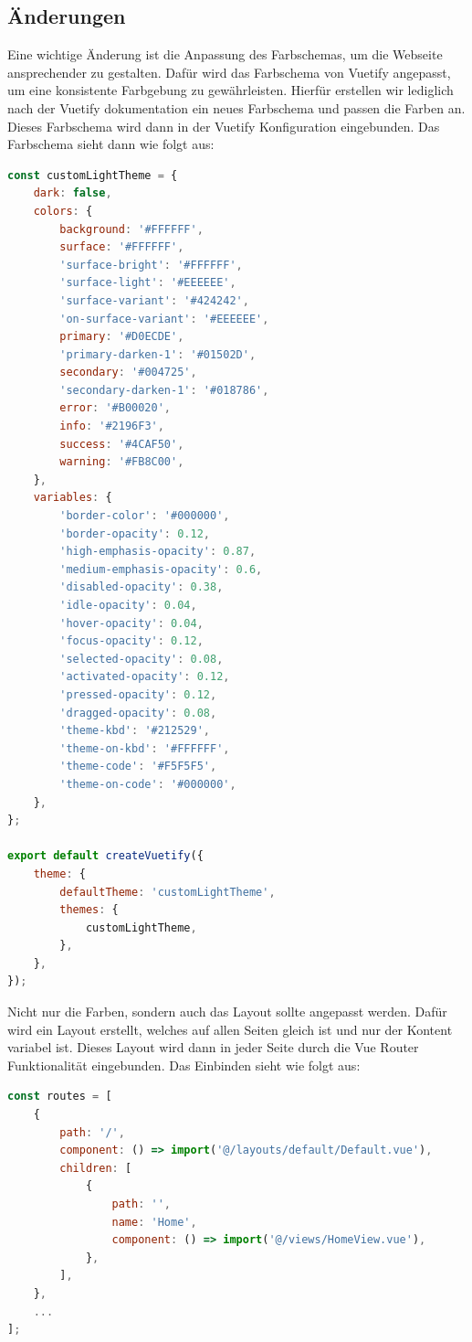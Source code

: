 \subsection{Änderungen}

Eine wichtige Änderung ist die Anpassung des Farbschemas, um die Webseite ansprechender zu gestalten. Dafür wird das Farbschema von Vuetify angepasst, um eine konsistente Farbgebung zu gewährleisten. Hierfür erstellen wir lediglich nach der Vuetify dokumentation ein neues Farbschema und passen die Farben an. Dieses Farbschema wird dann in der Vuetify Konfiguration eingebunden. Das Farbschema sieht dann wie folgt aus: \cite{vuetiy-custom-color-theme}

\begin{lstlisting}[language={JavaScript}, caption={Vuetify Farbschema anpassung}]
const customLightTheme = {
    dark: false,
    colors: {
        background: '#FFFFFF',
        surface: '#FFFFFF',
        'surface-bright': '#FFFFFF',
        'surface-light': '#EEEEEE',
        'surface-variant': '#424242',
        'on-surface-variant': '#EEEEEE',
        primary: '#D0ECDE',
        'primary-darken-1': '#01502D',
        secondary: '#004725',
        'secondary-darken-1': '#018786',
        error: '#B00020',
        info: '#2196F3',
        success: '#4CAF50',
        warning: '#FB8C00',
    },
    variables: {
        'border-color': '#000000',
        'border-opacity': 0.12,
        'high-emphasis-opacity': 0.87,
        'medium-emphasis-opacity': 0.6,
        'disabled-opacity': 0.38,
        'idle-opacity': 0.04,
        'hover-opacity': 0.04,
        'focus-opacity': 0.12,
        'selected-opacity': 0.08,
        'activated-opacity': 0.12,
        'pressed-opacity': 0.12,
        'dragged-opacity': 0.08,
        'theme-kbd': '#212529',
        'theme-on-kbd': '#FFFFFF',
        'theme-code': '#F5F5F5',
        'theme-on-code': '#000000',
    },
};

export default createVuetify({
    theme: {
        defaultTheme: 'customLightTheme',
        themes: {
            customLightTheme,
        },
    },
});
\end{lstlisting}

Nicht nur die Farben, sondern auch das Layout sollte angepasst werden.
Dafür wird ein Layout erstellt, welches auf allen Seiten gleich ist und nur der Kontent variabel ist.
Dieses Layout wird dann in jeder Seite durch die Vue Router Funktionalität eingebunden.
Das Einbinden sieht wie folgt aus:

\begin{lstlisting}[language={JavaScript}, caption={Einbindung des Layouts in der Vue Router Konfiguration}]
const routes = [
    {
        path: '/',
        component: () => import('@/layouts/default/Default.vue'),
        children: [
            {
                path: '',
                name: 'Home',
                component: () => import('@/views/HomeView.vue'),
            },
        ],
    },
    ...
];
\end{lstlisting}

